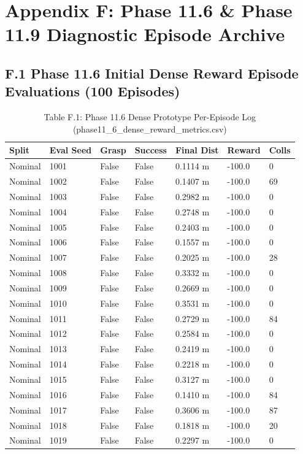 \documentclass[11pt,a4paper,oneside]{book}
\begin{document}
\chapter{Appendix F: Phase 11.6 \& Phase 11.9 Diagnostic Episode Archive}
\section{F.1 Phase 11.6 Initial Dense Reward Episode Evaluations (100 Episodes)}
\begin{longtable}{l l l l l l l}\caption{Table F.1: Phase 11.6 Dense Prototype Per-Episode Log (phase11\_6\_dense\_reward\_metrics.csv)}\\\toprule
Split & Eval Seed & Grasp & Success & Final Dist & Reward & Colls \\ \midrule \endhead
Nominal & 1001 & False & False & 0.1114 m & -100.0 & 0 \\
Nominal & 1002 & False & False & 0.1407 m & -100.0 & 69 \\
Nominal & 1003 & False & False & 0.2982 m & -100.0 & 0 \\
Nominal & 1004 & False & False & 0.2748 m & -100.0 & 0 \\
Nominal & 1005 & False & False & 0.2403 m & -100.0 & 0 \\
Nominal & 1006 & False & False & 0.1557 m & -100.0 & 0 \\
Nominal & 1007 & False & False & 0.2025 m & -100.0 & 28 \\
Nominal & 1008 & False & False & 0.3332 m & -100.0 & 0 \\
Nominal & 1009 & False & False & 0.2669 m & -100.0 & 0 \\
Nominal & 1010 & False & False & 0.3531 m & -100.0 & 0 \\
Nominal & 1011 & False & False & 0.2729 m & -100.0 & 84 \\
Nominal & 1012 & False & False & 0.2584 m & -100.0 & 0 \\
Nominal & 1013 & False & False & 0.2419 m & -100.0 & 0 \\
Nominal & 1014 & False & False & 0.2218 m & -100.0 & 0 \\
Nominal & 1015 & False & False & 0.3127 m & -100.0 & 0 \\
Nominal & 1016 & False & False & 0.1410 m & -100.0 & 84 \\
Nominal & 1017 & False & False & 0.3606 m & -100.0 & 87 \\
Nominal & 1018 & False & False & 0.1818 m & -100.0 & 20 \\
Nominal & 1019 & False & False & 0.2297 m & -100.0 & 0 \\

\end{longtable}
\end{document}
